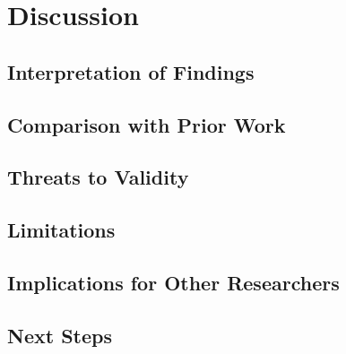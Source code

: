 \chapter{Discussion}

\section{Interpretation of Findings}
\section{Comparison with Prior Work}
\section{Threats to Validity}
\section{Limitations}
\section{Implications for Other Researchers}
\section{Next Steps}
